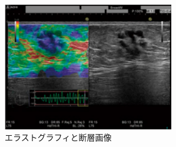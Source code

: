 \begin{figure}[H]
  \begin{center}
    \includegraphics[width=75mm]{fig/elastography2.pdf}
  \end{center}
  \caption{エラストグラフィと断層画像}
\end{figure}

